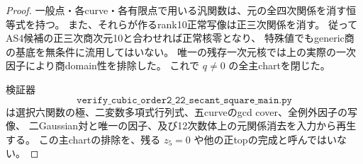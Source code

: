\begin{proof}
一般点・各curve・各有限点で用いる汎関数は、元の全四次関係を消す恒等式を持つ。
また、それらが作るrank10正常写像は正三次関係を消す。
従ってAS4候補の正三次商次元10と合わせれば正常核零となり、
特殊値でもgeneric商の基底を無条件に流用してはいない。
唯一の残存一次元核では上の実際の一次因子により商domain性を排除した。
これで $q\ne0$ の全主chartを閉じた。

検証器
\[
\texttt{verify\_cubic\_order2\_22\_secant\_square\_main.py}
\]
は選択六関数の極、二変数多項式行列式、五curveのgcd cover、全例外因子の写像、
二Gaussian対と唯一の因子、及び12次数体上の元関係消去を入力から再生する。
この主chartの排除を、残る $z_5=0$ や他の正topの完成と呼んではいない。
\end{proof}
